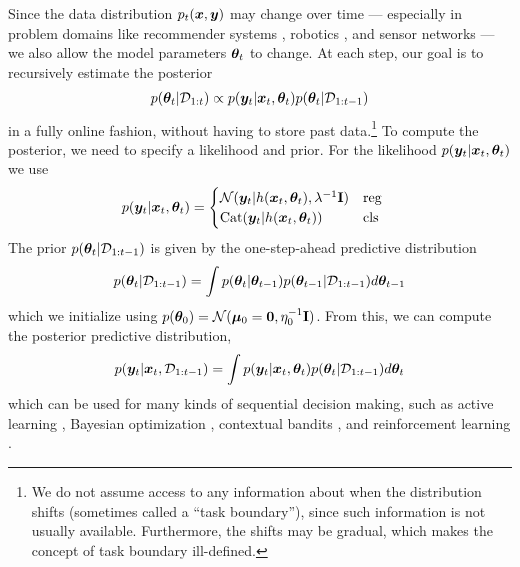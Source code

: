 Since the data distribution $p_t({\bm{x}},{\bm{y}})$ may change over time
---
especially in problem domains like 
recommender systems  \citep{Huang2015},
robotics \citep{Wolczyk2021,Lesort2020},
and sensor networks \citep{Ditzler2015}
---
we also allow the model parameters ${\bm{\theta}}_t$ to change.
At each step, our goal is to recursively estimate the posterior 
\begin{align}
p({\bm{\theta}}_t|{\mathcal{D}}_{1:t})
 \propto p({\bm{y}}_t|{\bm{x}}_t,{\bm{\theta}}_t) p({\bm{\theta}}_t|{\mathcal{D}}_{1:t-1})
 \label{eqn:post}
\end{align}
in a fully online fashion, without having
to store past data.\footnote{
%
We do not assume access to any information
about when the distribution shifts
(sometimes called a ``task boundary''),
since such information is not usually available.
Furthermore,  the shifts may be gradual, which makes the concept of task boundary ill-defined.
} %
To compute the posterior, we need to specify a likelihood and prior. For the likelihood 
$p({\bm{y}}_t|{\bm{x}}_t,{\bm{\theta}}_t)$
we use
\begin{align}
    p(\vy_t|\vx_t,\vtheta_t) &= 
    \begin{cases}
    \gauss(\vy_t|h(\vx_t,\vtheta_t), \lambda^{-1}\vI)
     & \mbox{reg} \\
     \cat(\vy_t|h(\vx_t,\vtheta_t)) %
     & \mbox{cls} 
    \end{cases}
    \label{eqn:likelihood}
\end{align}
The prior $p({\bm{\theta}}_t|{\mathcal{D}}_{1:t-1})$
is given by the one-step-ahead predictive distribution 
\begin{align}
p({\bm{\theta}}_t |{\mathcal{D}}_{1:t-1}) = \int p({\bm{\theta}}_t|{\bm{\theta}}_{t-1})
p({\bm{\theta}}_{t-1} | {\mathcal{D}}_{1:t-1}) d {\bm{\theta}}_{t-1}
\label{eqn:prior-predictive}
\end{align}
which we initialize using 
$p({\bm{\theta}}_0) = \mathcal{N}(\boldsymbol{\mu}_0=\boldsymbol{0}, \eta_0^{-1} \mathbf{I})$.
From this,
we can compute the posterior predictive distribution,
\begin{align}
  p({\bm{y}}_t|{\bm{x}}_t,{\mathcal{D}}_{1:t-1}) = \int p({\bm{y}}_t|{\bm{x}}_t,{\bm{\theta}}_t) p({\bm{\theta}}_t|{\mathcal{D}}_{1:t-1}) d{\bm{\theta}}_t
  \label{eqn:post-pred}
  \end{align}
which can be used for many kinds of sequential
decision making,
such as
active learning \citep{Holzmuller2022},
Bayesian optimization \citep{Garnett2023},
contextual bandits \citep{Duran-Martin2022},
and reinforcement learning \citep{Khetarpal2022,Wang2021}.


